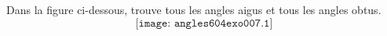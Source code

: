Dans la figure ci-dessous, trouve tous les angles aigus et tous les angles obtus.
\[\texttt{[image: angles604exo007.1]}\]
